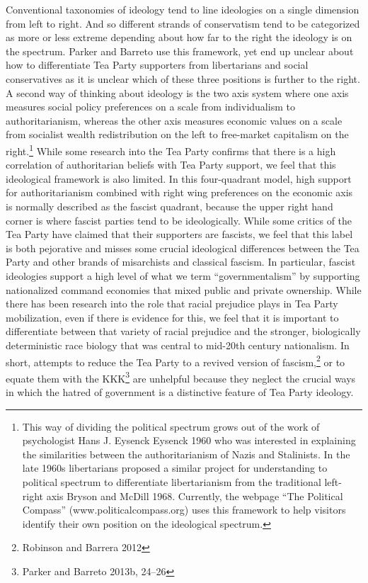\documentclass[12pt,]{article}
\begin{document}
Conventional taxonomies of ideology tend to line ideologies on a single
dimension from left to right. And so different strands of conservatism
tend to be categorized as more or less extreme depending about how far
to the right the ideology is on the spectrum. Parker and Barreto use
this framework, yet end up unclear about how to differentiate Tea Party
supporters from libertarians and social conservatives as it is unclear
which of these three positions is further to the right. A second way of
thinking about ideology is the two axis system where one axis measures
social policy preferences on a scale from individualism to
authoritarianism, whereas the other axis measures economic values on a
scale from socialist wealth redistribution on the left to free-market
capitalism on the right.\footnote{This way of dividing the political
  spectrum grows out of the work of psychologist Hans J. Eysenck Eysenck
  1960 who was interested in explaining the similarities between the
  authoritarianism of Nazis and Stalinists. In the late 1960s
  libertarians proposed a similar project for understanding to political
  spectrum to differentiate libertarianism from the traditional
  left-right axis Bryson and McDill 1968. Currently, the webpage ``The
  Political Compass'' (www.politicalcompass.org) uses this framework to
  help visitors identify their own position on the ideological spectrum.}
While some research into the Tea Party confirms that there is a high
correlation of authoritarian beliefs with Tea Party support, we feel
that this ideological framework is also limited. In this four-quadrant
model, high support for authoritarianism combined with right wing
preferences on the economic axis is normally described as the fascist
quadrant, because the upper right hand corner is where fascist parties
tend to be ideologically. While some critics of the Tea Party have
claimed that their supporters are fascists, we feel that this label is
both pejorative and misses some crucial ideological differences between
the Tea Party and other brands of misarchists and classical fascism. In
particular, fascist ideologies support a high level of what we term
``governmentalism'' by supporting nationalized command economies that
mixed public and private ownership. While there has been research into
the role that racial prejudice plays in Tea Party mobilization, even if
there is evidence for this, we feel that it is important to
differentiate between that variety of racial prejudice and the stronger,
biologically deterministic race biology that was central to mid-20th
century nationalism. In short, attempts to reduce the Tea Party to a
revived version of fascism,\footnote{Robinson and Barrera 2012} or to
equate them with the KKK\footnote{Parker and Barreto 2013b, 24--26} are
unhelpful because they neglect the crucial ways in which the hatred of
government is a distinctive feature of Tea Party ideology.
\end{document}

